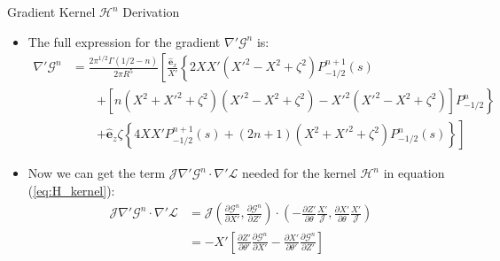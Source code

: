 \documentclass[8pt]{beamer}
\begin{document}
\begin{frame}{\color{white} Gradient Kernel $\mathcal{H}^n$ Derivation}
\begin{itemize}
    \item The full expression for the gradient $\nabla' \mathcal{G}^n$ is:
    \begin{align}
    \nabla' \mathcal{G}^n 
    &= \frac{2\pi^{1/2}\Gamma(1/2-n)}{2\pi R^5} \left[ \frac{\hat{\mathbf{e}}_x}{X'} \left\{ 2XX'(X'^2 - X^2 + \zeta^2)P_{-1/2}^{n+1}(s) \right. \right. \nonumber \\
    & \qquad \left. + \left[ n(X^2+X'^2+\zeta^2)(X'^2-X^2+\zeta^2) - X'^2(X'^2-X^2+\zeta^2) \right]P_{-1/2}^{n} \right\} \nonumber \\
    & \qquad \left. + \hat{\mathbf{e}}_z \zeta \left\{ 4XX'P_{-1/2}^{n+1}(s) + (2n+1)(X^2+X'^2+\zeta^2)P_{-1/2}^{n}(s) \right\} \right]
    \end{align}
    \item Now we can get the term $\mathcal{J}\nabla'\mathcal{G}^n \cdot\nabla'\mathcal{L}$ needed for the kernel $\mathcal{H}^n$ in equation (\ref{eq:H_kernel}):
    \begin{align}
         \mathcal{J}\nabla'\mathcal{G}^n\cdot\nabla'\mathcal{L} &= \mathcal{J}\left( \frac{ \partial \mathcal{G}^n}{\partial X' }, \frac{\partial \mathcal{G}^n}{ \partial Z'} \right) \cdot(-\frac{\partial Z'}{\partial \theta}\frac{X'}{\mathcal{J}},\frac{\partial X'}{\partial \theta}\frac{X'}{\mathcal{J}}) \\
         &= -X'\left[ \frac{\partial Z'}{\partial \theta'}\frac{\partial\mathcal{G}^n}{\partial X'} - \frac{\partial X'}{\partial \theta'} \frac{\partial \mathcal{G}^n}{\partial Z'} \right]
    \end{align}
\end{itemize}
\end{frame}
\end{document}
